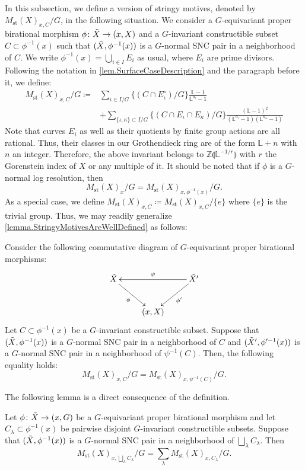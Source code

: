 \documentclass[12pt]{amsart}
\theoremstyle{plain}   %
\theoremstyle{definition}    %
\theoremstyle{remark}    %
\numberwithin{equation}{theorem}
\DeclareMathOperator{\st}{\mathrm{st}}
\newcommand{\bL}{\mathbb{L}}
\newcommand{\bZ}{\mathbb{Z}}
\begin{document}
In this subsection, we define a version of stringy motives, denoted by $M_{\st}(X)_{x,C}/G$, in the following situation. We consider a $G$-equivariant proper birational morphism $\phi \colon \Tilde{X} \to (x,X)$ and a $G$-invariant constructible subset $C \subset \phi^{-1}(x)$ such that
$(\Tilde{X},\phi^{-1}(x))$ is a $G$-normal SNC pair in a neighborhood of $C$. We write $\phi^{-1}(x)=\bigcup_{i\in I} E_i$ as usual, where $E_i$ are prime divisors. Following the notation in  \autoref{lem.SurfaceCaseDescription} and the paragraph before it, 
we define:
\begin{equation}\label{eq.def-formula}
\begin{split}
M_{\st}(X)_{x,C}/G 
\coloneqq & \sum_{\iota\in I/G}\{(C \cap E_\iota^\circ)/G\}\frac{\bL-1}{\bL^{a_{\iota}}-1} \\ 
&+\sum_{\{\iota, \kappa\}\subset I/G}\{(C\cap E_\iota\cap E_\kappa)/G\}\frac{(\bL-1)^{2}}{(\bL^{a_{\iota}}-1)(\bL^{a_{\kappa}}-1)}
\end{split}
\end{equation}
Note that curves $E_i$ as well as their quotients by finite group actions are all rational. Thus, their classes in our Grothendieck ring are of the form $\bL+n$ with $n$ an integer. Therefore, the above invariant belongs to $\bZ\llparenthesis\bL^{-1/r} \rrparenthesis $ with $r$ the Gorenstein index of $X$ or any multiple of it. 
It should be noted that if $\phi$ is a $G$-normal log resolution, then
\[
M_{\st}(X)_{x}/G = M_{\st}(X)_{x,\phi^{-1}(x)}/G.
\]
As a special case, we define $M_{\st}(X)_{x,C} \coloneqq M_{\st}(X)_{x,C}/\{e\}$ where $\{e\}$ is the trivial group. Thus, we may readily generalize \autoref{lemma.StringyMotivesAreWellDefined} as follows:
\begin{lemma}
Consider the following commutative diagram of $G$-equivariant proper birational morphisms:
\[
\xymatrix{
\Tilde{X} \ar[dr]_-{\phi} & & \Tilde{X}' \ar[dl]^-{\phi'} \ar[ll]_-{\psi}\\
& (x,X) &
}
\]
Let $C \subset \phi^{-1}(x)$ be a $G$-invariant constructible subset. Suppose that $(\Tilde{X},\phi^{-1}(x))$ is a $G$-normal SNC pair in a neighborhood of $C$ and $(\Tilde{X}',\phi'^{-1}(x))$ is a $G$-normal SNC pair in a neighborhood of $\psi^{-1}(C)$. Then, the following equality holds:
\[
M_{\st}(X)_{x,C}/G = M_{\st}(X)_{x,\psi^{-1}(C)}/G.
\]
\end{lemma}

The following lemma is a direct consequence of the definition.

\begin{lemma}
Let $\phi \colon \Tilde{X} \to (x,G)$ be a $G$-equivariant proper birational morphism and let $C_{\lambda} \subset \phi^{-1}(x)$ be pairwise disjoint $G$-invariant constructible subsets. Suppose that $(\Tilde{X},\phi^{-1}(x))$ is a $G$-normal SNC pair in a neighborhood of $\bigsqcup_\lambda C_\lambda$. Then
\[
M_{\st}(X)_{x,\bigsqcup_{\lambda} C_{\lambda}}/G = \sum_{\lambda} M_{\st}(X)_{x,C_{\lambda}}/G.
\]
\end{lemma}
\end{document}
